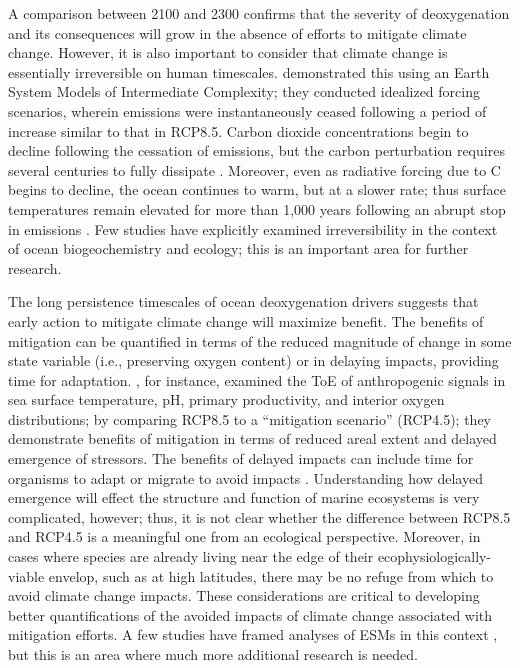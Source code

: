 \documentclass{report_chapter}
\begin{document}
A comparison between 2100 and 2300 confirms that the severity of deoxygenation and its consequences will grow in the absence of efforts to mitigate climate change.
However, it is also important to consider that climate change is essentially irreversible on human timescales.
\citet{Solomon-Plattner-etal-2009} demonstrated this using an Earth System Models of Intermediate Complexity; they conducted idealized forcing scenarios, wherein emissions were instantaneously ceased following a period of increase similar to that in RCP8.5.
Carbon dioxide concentrations begin to decline following the cessation of emissions, but the carbon perturbation requires several centuries to fully dissipate \citep{Archer-Kheshgi-etal-1997,Archer-Brovkin-2008}.
Moreover, even as radiative forcing due to C\OO{} begins to decline, the ocean continues to warm, but at a slower rate; thus surface temperatures remain elevated for more than 1,000 years following an abrupt stop in emissions \citep{Solomon-Plattner-etal-2009}.
Few studies have explicitly examined irreversibility in the context of ocean biogeochemistry and ecology; this is an important area for further research.

The long persistence timescales of ocean deoxygenation drivers suggests that early action to mitigate climate change will maximize benefit.
The benefits of mitigation can be quantified in terms of the reduced magnitude of change in some state variable (i.e., preserving oxygen content) or in  delaying impacts, providing time for adaptation.
\citet{Henson-Beaulieu-etal-2017}, for instance, examined the ToE of anthropogenic signals in sea surface temperature, pH, primary productivity, and interior oxygen distributions; by comparing RCP8.5 to a ``mitigation scenario'' (RCP4.5); they demonstrate benefits of mitigation in terms of reduced areal extent and delayed emergence of stressors.
The benefits of delayed impacts can include time for organisms to adapt or migrate to avoid impacts \citep{Henson-Beaulieu-etal-2017}.
Understanding how delayed emergence will effect the structure and function of marine ecosystems is very complicated, however; thus, it is not clear whether the difference between RCP8.5 and RCP4.5 is a meaningful one from an ecological perspective.
Moreover, in cases where species are already living near the edge of their ecophysiologically-viable envelop, such as at high latitudes, there may be no refuge from which to avoid climate change impacts.
These considerations are critical to developing better quantifications of the avoided impacts of climate change associated with mitigation efforts.
A few studies have framed analyses of ESMs in this context \citep[e.g.,][]{Krumhardt-Lovenduski-etal-2016}, but this is an area where much more additional research is needed.
\end{document}
